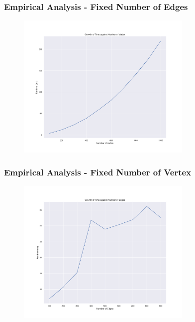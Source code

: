 \documentclass{beamer}
\begin{document}
\begin{frame}
	\frametitle{Empirical Analysis - Fixed Number of Edges}
	\begin{figure}
		\centering
		\includegraphics[width=0.75\textwidth]{pict/Q2_fixedEdges.png}	
	\end{figure}
\end{frame}

\begin{frame}
	\frametitle{Empirical Analysis - Fixed Number of Vertex}
	\begin{figure}
		\centering
		\includegraphics[width=0.75\textwidth]{pict/Q2_fixedVertex.png}	
	\end{figure}
\end{frame}
\end{document}
